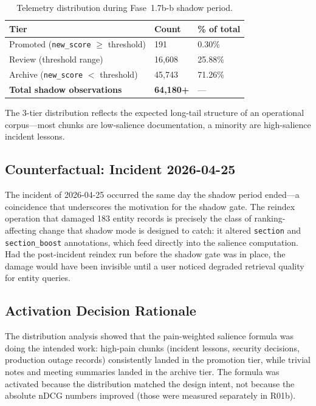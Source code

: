 \documentclass{article}
\begin{document}
\begin{table}[h]
  \caption{Telemetry distribution during Fase~1.7b-b shadow period.}
  \centering
  \begin{tabular}{lll}
    \toprule
    Tier & Count & \% of total \\
    \midrule
    Promoted (\texttt{new\_score} $\geq$ threshold) & 191 & 0.30\% \\
    Review (threshold range) & 16,608 & 25.88\% \\
    Archive (\texttt{new\_score} $<$ threshold) & 45,743 & 71.26\% \\
    \textbf{Total shadow observations} & \textbf{64,180+} & --- \\
    \bottomrule
  \end{tabular}
  \begin{minipage}{0.9\linewidth}
    \vspace{4pt}
    \footnotesize
    The 3-tier distribution reflects the expected long-tail structure of an operational
    corpus---most chunks are low-salience documentation, a minority are high-salience
    incident lessons.
  \end{minipage}
\end{table}

\subsection{Counterfactual: Incident 2026-04-25}

The incident of 2026-04-25 occurred the same day the shadow period ended---a coincidence
that underscores the motivation for the shadow gate. The reindex operation that damaged 183
entity records is precisely the class of ranking-affecting change that shadow mode is
designed to catch: it altered \texttt{section} and \texttt{section\_boost} annotations,
which feed directly into the salience computation. Had the post-incident reindex run before
the shadow gate was in place, the damage would have been invisible until a user noticed
degraded retrieval quality for entity queries.

\subsection{Activation Decision Rationale}

The distribution analysis showed that the pain-weighted salience formula was doing the
intended work: high-pain chunks (incident lessons, security decisions, production outage
records) consistently landed in the promotion tier, while trivial notes and meeting
summaries landed in the archive tier. The formula was activated because the distribution
matched the design intent, not because the absolute nDCG numbers improved (those were
measured separately in R01b).
\end{document}
